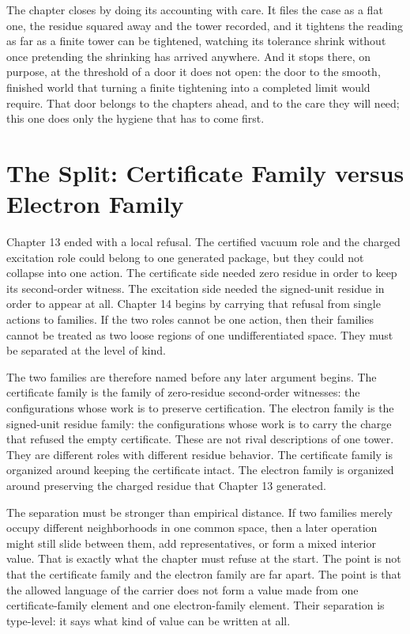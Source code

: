 The chapter closes by doing its accounting with care. It files the case as a flat one, the residue squared away and the tower recorded, and it tightens the reading as far as a finite tower can be tightened, watching its tolerance shrink without once pretending the shrinking has arrived anywhere. And it stops there, on purpose, at the threshold of a door it does not open: the door to the smooth, finished world that turning a finite tightening into a completed limit would require. That door belongs to the chapters ahead, and to the care they will need; this one does only the hygiene that has to come first.

\section{The Split: Certificate Family versus Electron Family}

Chapter 13 ended with a local refusal. The certified vacuum role and the
charged excitation role could belong to one generated package, but they could
not collapse into one action. The certificate side needed zero residue in order
to keep its second-order witness. The excitation side needed the signed-unit
residue in order to appear at all. Chapter 14 begins by carrying that refusal
from single actions to families. If the two roles cannot be one action, then
their families cannot be treated as two loose regions of one undifferentiated
space. They must be separated at the level of kind.

The two families are therefore named before any later argument begins. The
certificate family is the family of zero-residue second-order witnesses: the
configurations whose work is to preserve certification. The electron family is
the signed-unit residue family: the configurations whose work is to carry the
charge that refused the empty certificate. These are not rival descriptions of
one tower. They are different roles with different residue behavior. The
certificate family is organized around keeping the certificate intact. The
electron family is organized around preserving the charged residue that Chapter
13 generated.

The separation must be stronger than empirical distance. If two families merely
occupy different neighborhoods in one common space, then a later operation
might still slide between them, add representatives, or form a mixed interior
value. That is exactly what the chapter must refuse at the start. The point is
not that the certificate family and the electron family are far apart. The point
is that the allowed language of the carrier does not form a value made from one
certificate-family element and one electron-family element. Their separation is
type-level: it says what kind of value can be written at all.

